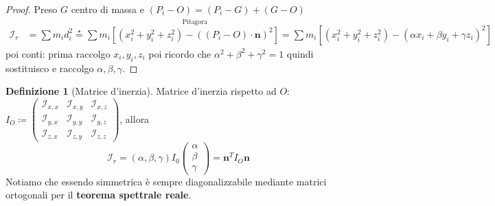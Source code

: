 \documentclass[a4paper,10pt]{article}
\theoremstyle{definition}
\theoremstyle{indentdefinition}
\newtheorem{defn}{Definizione}[section]
\theoremstyle{indenttheorem}
\theoremstyle{myremark}
\theoremstyle{indentgeneral}
\begin{document}
\begin{proof}
Preso $G$ centro di massa e $\left(P_{i}-O\right)=\left(P_{i}-G\right)+\left(G-O\right)$
\begin{align*}
\mathcal{I}_{r} & =\sum m_{i}d_{i}^{2}\overset{\star}{=}\sum m_{i}\overset{\text{Pitagora}}{\left[\left(x_{i}^{2}+y_{i}^{2}+z_{i}^{2}\right)-\left(\left(P_{i}-O\right)\cdot\boldsymbol{n}\right)^{2}\right]}=\sum m_{i}\left[\left(x_{i}^{2}+y_{i}^{2}+z_{i}^{2}\right)-\left(\alpha x_{i}+\beta y_{i}+\gamma z_{i}\right)^{2}\right]
\end{align*}
poi conti: prima raccolgo $x_i,y_i,z_i$ poi ricordo che  $\alpha^2+\beta^2+\gamma^2=1$ quindi sostituisco e raccolgo $\alpha,\beta,\gamma$.
\end{proof}
\begin{defn}[Matrice d'inerzia] Matrice d'inerzia rispetto ad $O$:
$I_{O}\coloneqq\begin{pmatrix}\mathcal{I}_{x,x} & \mathcal{I}_{x,y} & \mathcal{I}_{x,z}\\
\mathcal{I}_{y,x} & \mathcal{I}_{y,y} & \mathcal{I}_{y,z}\\
\mathcal{I}_{z,x} & \mathcal{I}_{z,y} & \mathcal{I}_{z,z}
\end{pmatrix}$, allora $$\mathcal{I}_{r}=\left(\alpha,\beta,\gamma\right)I_{0}\begin{pmatrix}\alpha\\
\beta\\
\gamma
\end{pmatrix}=\boldsymbol{n}^T I_{O}\boldsymbol{n}$$
Notiamo che essendo simmetrica è sempre diagonalizzabile mediante matrici ortogonali per il \textbf{teorema spettrale reale}.
\end{defn}
\end{document}
